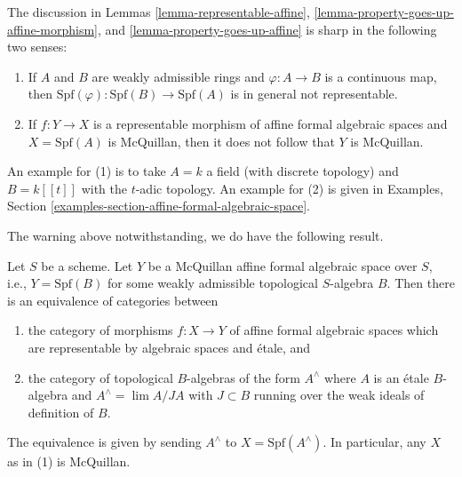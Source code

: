 \begin{remark}[Warning]
\label{remark-warning}
The discussion in Lemmas \ref{lemma-representable-affine},
\ref{lemma-property-goes-up-affine-morphism}, and
\ref{lemma-property-goes-up-affine}
is sharp in the following two senses:
\begin{enumerate}
\item If $A$ and $B$ are weakly admissible rings and $\varphi : A \to B$
is a continuous map, then
$\text{Spf}(\varphi) : \text{Spf}(B) \to \text{Spf}(A)$ is in general
not representable.
\item If $f : Y \to X$ is a representable morphism of affine
formal algebraic spaces and $X = \text{Spf}(A)$ is McQuillan,
then it does not follow that $Y$ is McQuillan.
\end{enumerate}
An example for (1) is to take $A = k$ a field (with discrete topology)
and $B = k[[t]]$ with the $t$-adic topology.
An example for (2) is given in
Examples, Section \ref{examples-section-affine-formal-algebraic-space}.
\end{remark}

\noindent
The warning above notwithstanding, we do have the following result.

\begin{lemma}
\label{lemma-etale}
Let $S$ be a scheme. Let $Y$ be a McQuillan affine formal algebraic space
over $S$, i.e., $Y = \text{Spf}(B)$ for some weakly admissible topological
$S$-algebra $B$. Then there is an equivalence of categories between
\begin{enumerate}
\item the category of morphisms $f : X \to Y$
of affine formal algebraic spaces which are representable
by algebraic spaces and \'etale, and
\item the category of topological $B$-algebras of the form
$A^\wedge$ where $A$ is an \'etale $B$-algebra and
$A^\wedge = \lim A/JA$ with $J \subset B$ running over the
weak ideals of definition of $B$.
\end{enumerate}
The equivalence is given by sending $A^\wedge$ to  $X = \text{Spf}(A^\wedge)$.
In particular, any $X$ as in (1) is McQuillan.
\end{lemma}

